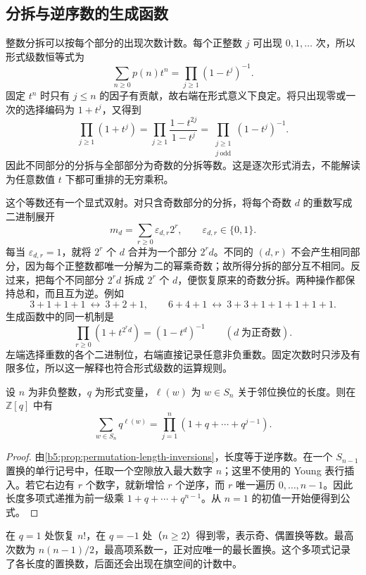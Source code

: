 \subsection{分拆与逆序数的生成函数}
\label{b5:subsec:A03:02}

整数分拆可以按每个部分的出现次数计数。每个正整数 \(j\) 可出现 \(0,1,\ldots\) 次，所以形式级数恒等式为
\[
	\sum_{n\ge0}p(n)t^n=\prod_{j\ge1}(1-t^j)^{-1}.
\]
固定 \(t^n\) 时只有 \(j\le n\) 的因子有贡献，故右端在形式意义下良定。将只出现零或一次的选择编码为 \(1+t^j\)，又得到
\[
	\prod_{j\ge1}(1+t^j) =\prod_{j\ge1}\frac{1-t^{2j}}{1-t^j} =\prod_{\substack{j\ge1\\j\ \mathrm{odd}}}(1-t^j)^{-1}.
\]
因此不同部分的分拆与全部部分为奇数的分拆等数。这是逐次形式消去，不能解读为任意数值 \(t\) 下都可重排的无穷乘积。

\ProseParagraphBreak
这个等数还有一个显式双射。对只含奇数部分的分拆，将每个奇数 \(d\) 的重数写成二进制展开
\[
	m_d=\sum_{r\ge0}\varepsilon_{d,r}2^r, \qquad \varepsilon_{d,r}\in\{0,1\}.
\]
每当 \(\varepsilon_{d,r}=1\)，就将 \(2^r\) 个 \(d\) 合并为一个部分 \(2^rd\)。不同的 \((d,r)\) 不会产生相同部分，因为每个正整数都唯一分解为二的幂乘奇数；故所得分拆的部分互不相同。反过来，把每个不同部分 \(2^rd\) 拆成 \(2^r\) 个 \(d\)，便恢复原来的奇数分拆。两种操作都保持总和，而且互为逆。例如
\[
	3+1+1+1\ \longleftrightarrow\ 3+2+1, \qquad 6+4+1\ \longleftrightarrow\ 3+3+1+1+1+1+1.
\]
生成函数中的同一机制是
\[
	\prod_{r\ge0}(1+t^{2^rd})=(1-t^d)^{-1} \qquad(d\;\text{为正奇数}).
\]
左端选择重数的各个二进制位，右端直接记录任意非负重数。固定次数时只涉及有限多位，所以这一解释也符合形式级数的运算规则。

\begin{proposition}\label{b5:prop:permutation-length-enumerator}
	设 \(n\) 为非负整数，\(q\) 为形式变量，\(\ell(w)\) 为 \(w\in S_n\) 关于邻位换位的长度。则在 \(\mathbb Z[q]\) 中有
	\[
		\sum_{w\in S_n}q^{\ell(w)} =\prod_{j=1}^n(1+q+\cdots+q^{j-1}).
	\]
\end{proposition}
\begin{proof}
	由\cref{b5:prop:permutation-length-inversions}，长度等于逆序数。在一个 \(S_{n-1}\) 置换的单行记号中，任取一个空隙放入最大数字 \(n\)；这里不使用的 Young 表行插入。若它右边有 \(r\) 个数字，就新增恰 \(r\) 个逆序，而 \(r\) 唯一遍历 \(0,\ldots,n-1\)。因此长度多项式递推为前一级乘 \(1+q+\cdots+q^{n-1}\)。从 \(n=1\) 的初值一开始便得到公式。
\end{proof}

在 \(q=1\) 处恢复 \(n!\)，在 \(q=-1\) 处（\(n\ge2\)）得到零，表示奇、偶置换等数。最高次数为 \(n(n-1)/2\)，最高项系数一，正对应唯一的最长置换。这个多项式记录了各长度的置换数，后面还会出现在旗空间的计数中。

